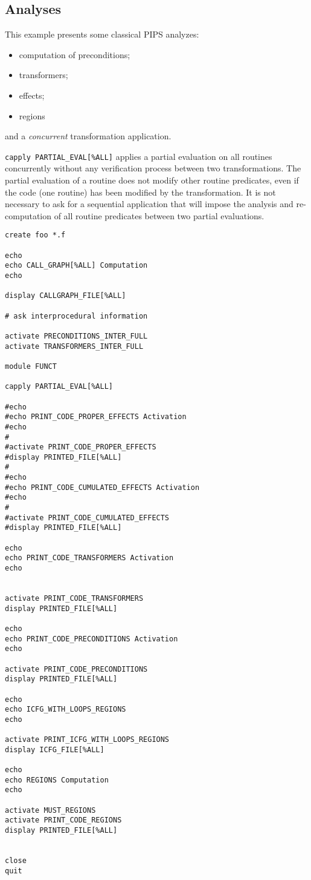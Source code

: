 \documentclass[a4paper]{article}
\begin{document}
\subsection{Analyses}
\label{exm4}

This example presents some classical PIPS analyzes:

\begin{itemize}
\item computation of preconditions;
\item transformers;
\item effects;
\item regions
\end{itemize}
and a {\it concurrent} transformation application.

\verb+capply PARTIAL_EVAL[%ALL]+
applies a partial evaluation on all routines concurrently without any
verification process between two transformations. The partial evaluation
of a routine does not modify other routine predicates, even if the code
(one routine) has been modified by the transformation. It is not
necessary to ask for a sequential application that will impose the
analysis and re-computation of all routine predicates between two partial
evaluations.

\begin{verbatim}
create foo *.f

echo
echo CALL_GRAPH[%ALL] Computation
echo

display CALLGRAPH_FILE[%ALL]

# ask interprocedural information

activate PRECONDITIONS_INTER_FULL
activate TRANSFORMERS_INTER_FULL

module FUNCT

capply PARTIAL_EVAL[%ALL]

#echo
#echo PRINT_CODE_PROPER_EFFECTS Activation
#echo
#
#activate PRINT_CODE_PROPER_EFFECTS
#display PRINTED_FILE[%ALL]
#
#echo
#echo PRINT_CODE_CUMULATED_EFFECTS Activation
#echo
#
#activate PRINT_CODE_CUMULATED_EFFECTS
#display PRINTED_FILE[%ALL]

echo
echo PRINT_CODE_TRANSFORMERS Activation
echo


activate PRINT_CODE_TRANSFORMERS
display PRINTED_FILE[%ALL]

echo
echo PRINT_CODE_PRECONDITIONS Activation
echo

activate PRINT_CODE_PRECONDITIONS
display PRINTED_FILE[%ALL]

echo
echo ICFG_WITH_LOOPS_REGIONS
echo 

activate PRINT_ICFG_WITH_LOOPS_REGIONS
display ICFG_FILE[%ALL]

echo 
echo REGIONS Computation
echo

activate MUST_REGIONS
activate PRINT_CODE_REGIONS
display PRINTED_FILE[%ALL]


close 
quit
\end{verbatim}
\end{document}
